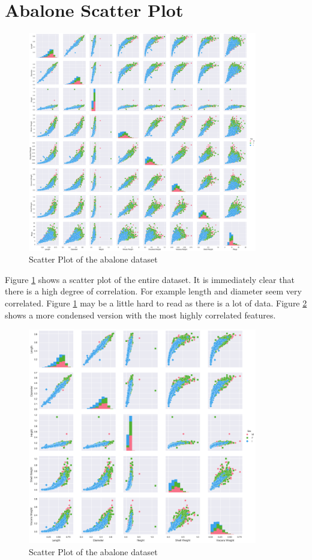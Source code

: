 \section{Abalone Scatter Plot}

\begin{figure}[H]
  \centering
  \includegraphics[scale=0.5,width=100mm]{./images/abalone-scatter-plot.png}
  \caption{Scatter Plot of the abalone dataset}
  \label{fig:abalones-scatter-plot}
\end{figure}

Figure \ref{fig:abalones-scatter-plot} shows a scatter plot of the entire dataset. It is immediately clear that there is a high degree of correlation. For example length and diameter seem very correlated. Figure \ref{fig:abalones-scatter-plot} may be a little hard to read as there is a lot of data. Figure \ref{fig:abalones-scatter-plot-condensed} shows a more condensed version with the most highly correlated features.

\begin{figure}[H]
  \centering
  \includegraphics[scale=0.5,width=100mm]{./images/abalone-scatter-plot-condensed.png}
  \caption{Scatter Plot of the abalone dataset}
  \label{fig:abalones-scatter-plot-condensed}
\end{figure}

